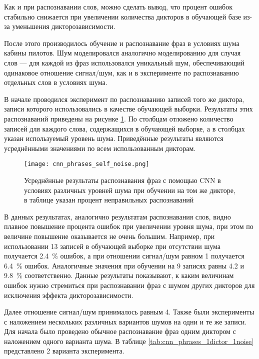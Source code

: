 Как и при распознавании слов, можно сделать вывод, что процент ошибок стабильно снижается при увеличении количества дикторов в обучающей базе из-за уменьшения дикторозависимости.

После этого производилось обучение и распознавание фраз в условиях шума кабины пилотов.
Шум моделировался аналогично моделированию для случая слов --- для каждой из фраз использовался уникальный шум, обеспечивающий одинаковое отношение сигнал/шум, как и в эксперименте по распознаванию отдельных слов в условиях шума.

В начале проводился эксперимент по распознаванию записей того же диктора, записи которого использовались в качестве обучающей выборки.
Результаты этих распознаваний приведены на рисунке \ref{fig:cnn_phrases_self_noise}.
По столбцам отложено количество записей для каждого слова, содержащихся в обучающей выборке, а в столбцах указан используемый уровень шума.
Приведённые результаты являются усреднёнными значениями по всем использованным дикторам.

\begin{figure}[h]
	\centering
	\texttt{[image: cnn\_phrases\_self\_noise.png]}
	\caption{Усреднённые результаты распознавания фраз с помощью CNN в условиях различных уровней шума при обучении на том же дикторе, в таблице указан процент неправильных распознаваний}
	\label{fig:cnn_phrases_self_noise}
\end{figure}

В данных результатах, аналогично результатам распознавания слов, видно плавное повышение процента ошибок при увеличении уровня шума, при этом по величине повышение оказывается не очень большим.
Например, при использовании 13 записей в обучающей выборке при отсутствии шума получается 2.4~\% ошибок, а при отношении сигнал/шум равном 1 получается 6.4~\% ошибок.
Аналогичные значения при обучении на 9 записях равны 4.2 и 9.8~\% соответственно.
Данные результаты показывают, к каким величинам ошибок нужно стремиться при распознавании фраз с шумом других дикторов для исключения эффекта дикторозависимости.

Далее отношение сигнал/шум принималось равным 4.
Также были эксперименты с наложением нескольких различных вариантов шумов на одни и те же записи.
Для начала было проведено обычное распознавание фраз одним диктором с наложением одного варианта шума.
В таблице \ref{tab:cnn_phrases_1dictor_1noise} представлено 2 варианта эксперимента.

